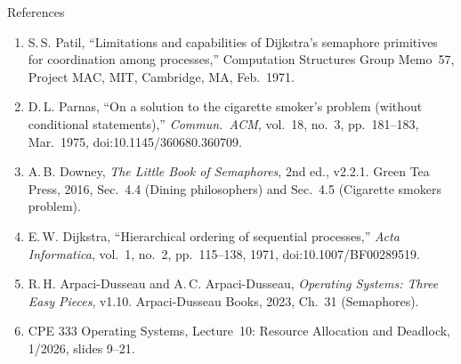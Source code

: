 \documentclass[aspectratio=169,11pt]{beamer}
\begin{document}
\begin{frame}{References}
  \scriptsize
  \begin{enumerate}
    \item[{[1]}] S.\,S. Patil, ``Limitations and capabilities of Dijkstra's
      semaphore primitives for coordination among processes,'' Computation
      Structures Group Memo~57, Project MAC, MIT, Cambridge, MA, Feb.~1971.
    \item[{[2]}] D.\,L. Parnas, ``On a solution to the cigarette smoker's
      problem (without conditional statements),'' \emph{Commun.\ ACM},
      vol.~18, no.~3, pp.~181--183, Mar.~1975, doi:10.1145/360680.360709.
    \item[{[3]}] A.\,B. Downey, \emph{The Little Book of Semaphores}, 2nd ed.,
      v2.2.1. Green Tea Press, 2016, Sec.~4.4 (Dining philosophers) and
      Sec.~4.5 (Cigarette smokers problem).
    \item[{[4]}] E.\,W. Dijkstra, ``Hierarchical ordering of sequential
      processes,'' \emph{Acta Informatica}, vol.~1, no.~2, pp.~115--138, 1971,
      doi:10.1007/BF00289519.
    \item[{[5]}] R.\,H. Arpaci-Dusseau and A.\,C. Arpaci-Dusseau,
      \emph{Operating Systems: Three Easy Pieces}, v1.10.
      Arpaci-Dusseau Books, 2023, Ch.~31 (Semaphores).
    \item[{[6]}] CPE 333 Operating Systems, Lecture~10: Resource Allocation
      and Deadlock, 1/2026, slides 9--21.
  \end{enumerate}
\end{frame}
\end{document}
